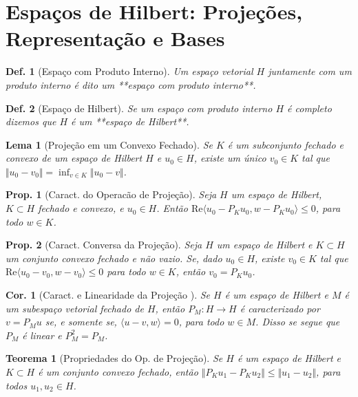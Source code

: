 \documentclass[11pt]{article}
\theoremstyle{yellowhead}
\newtheorem*{theorem}{Teorema}
\newtheorem*{lemma}{Lema}
\newtheorem*{proposition}{Prop.}
\newtheorem*{corollary}{Cor.}
\theoremstyle{yellowdef}
\newtheorem*{definition}{Def.}
\begin{document}
\section{Espaços de Hilbert: Projeções, Representação e Bases}
\begin{multicols}{3}

\begin{definition}[Espaço com Produto Interno]
Um espaço vetorial $H$ juntamente com um produto interno é dito um **espaço com produto interno**.
\end{definition}

\begin{definition}[Espaço de Hilbert]
Se um espaço com produto interno $H$ é completo dizemos que $H$ é um **espaço de Hilbert**.
\end{definition}

\begin{lemma}[Projeção em um Convexo Fechado]
Se $K$ é um subconjunto fechado e convexo de um espaço de Hilbert $H$ e $u_0 \in H$, existe um único $v_0 \in K$ tal que $\Vert u_0 - v_0 \Vert = \inf_{v \in K} \Vert u_0 - v \Vert$.
\end{lemma}

\begin{proposition}[Caract. do Operacão de Projeção]
Seja $H$ um espaço de Hilbert, $K \subset H$ fechado e convexo, e $u_0 \in H$. Então $\text{Re}\langle u_0 - P_K u_0, w - P_K u_0 \rangle \le 0$, para todo $w \in K$.
\end{proposition}

\begin{proposition}[Caract. Conversa da Projeção]
Seja $H$ um espaço de Hilbert e $K \subset H$ um conjunto convexo fechado e não vazio. Se, dado $u_0 \in H$, existe $v_0 \in K$ tal que $\text{Re}\langle u_0 - v_0, w - v_0 \rangle \le 0$ para todo $w \in K$, então $v_0 = P_K u_0$.
\end{proposition}

\begin{corollary}[Caract. e Linearidade da Projeção ]
Se $H$ é um espaço de Hilbert e $M$ é um subespaço vetorial fechado de $H$, então $P_M: H \to H$ é caracterizado por $v = P_M u$ se, e somente se, $\langle u - v, w \rangle = 0$, para todo $w \in M$. Disso se segue que $P_M$ é linear e $P_M^2 = P_M$.
\end{corollary}

\begin{theorem}[Propriedades do Op. de Projeção]
Se $H$ é um espaço de Hilbert e $K \subset H$ é um conjunto convexo fechado, então $\Vert P_K u_1 - P_K u_2 \Vert \le \Vert u_1 - u_2 \Vert$, para todos $u_1, u_2 \in H$.
\end{theorem}


\end{multicols}
\end{document}
